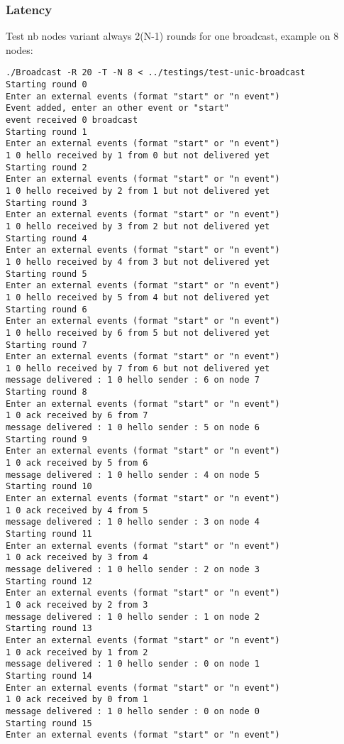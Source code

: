 \documentclass[a4paper]{article}
\begin{document}
\subsubsection*{Latency}
Test nb nodes variant always 2(N-1) rounds for one broadcast, example on 8
nodes:
\begin{verbatim}
./Broadcast -R 20 -T -N 8 < ../testings/test-unic-broadcast 
Starting round 0
Enter an external events (format "start" or "n event")
Event added, enter an other event or "start"
event received 0 broadcast
Starting round 1
Enter an external events (format "start" or "n event")
1 0 hello received by 1 from 0 but not delivered yet
Starting round 2
Enter an external events (format "start" or "n event")
1 0 hello received by 2 from 1 but not delivered yet
Starting round 3
Enter an external events (format "start" or "n event")
1 0 hello received by 3 from 2 but not delivered yet
Starting round 4
Enter an external events (format "start" or "n event")
1 0 hello received by 4 from 3 but not delivered yet
Starting round 5
Enter an external events (format "start" or "n event")
1 0 hello received by 5 from 4 but not delivered yet
Starting round 6
Enter an external events (format "start" or "n event")
1 0 hello received by 6 from 5 but not delivered yet
Starting round 7
Enter an external events (format "start" or "n event")
1 0 hello received by 7 from 6 but not delivered yet
message delivered : 1 0 hello sender : 6 on node 7
Starting round 8
Enter an external events (format "start" or "n event")
1 0 ack received by 6 from 7 
message delivered : 1 0 hello sender : 5 on node 6
Starting round 9
Enter an external events (format "start" or "n event")
1 0 ack received by 5 from 6 
message delivered : 1 0 hello sender : 4 on node 5
Starting round 10
Enter an external events (format "start" or "n event")
1 0 ack received by 4 from 5 
message delivered : 1 0 hello sender : 3 on node 4
Starting round 11
Enter an external events (format "start" or "n event")
1 0 ack received by 3 from 4 
message delivered : 1 0 hello sender : 2 on node 3
Starting round 12
Enter an external events (format "start" or "n event")
1 0 ack received by 2 from 3 
message delivered : 1 0 hello sender : 1 on node 2
Starting round 13
Enter an external events (format "start" or "n event")
1 0 ack received by 1 from 2 
message delivered : 1 0 hello sender : 0 on node 1
Starting round 14
Enter an external events (format "start" or "n event")
1 0 ack received by 0 from 1 
message delivered : 1 0 hello sender : 0 on node 0
Starting round 15
Enter an external events (format "start" or "n event")
\end{verbatim}
\end{document}
